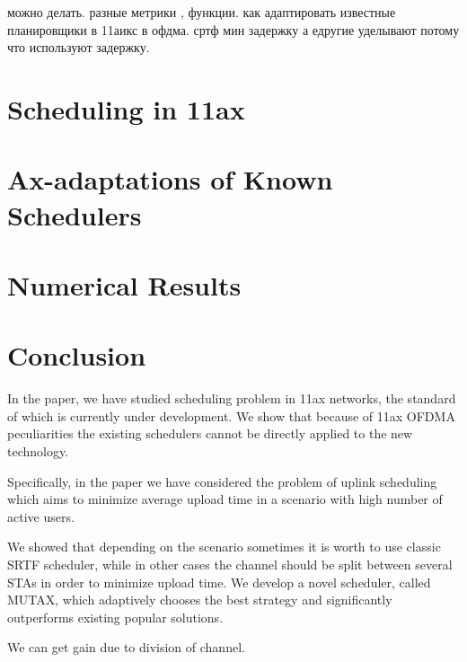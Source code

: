 можно делать. разные метрики , функции. как адаптировать известные планировщики в 11аикс в офдма. 
сртф мин задержку а едругие уделывают потому что используют задержку. 
\section{Scheduling in 11ax}

\section{Ax-adaptations of Known Schedulers}

\section{Numerical Results}

\section{Conclusion}

In the paper, we have studied scheduling problem in 11ax networks, the standard of which is currently under development.
We show that because of 11ax OFDMA peculiarities the existing schedulers cannot be directly applied to the new technology.

Specifically, in the paper we have considered the problem of uplink scheduling which aims to minimize average upload time in a scenario with high number of active users.

We showed that depending on the scenario sometimes it is worth to use classic SRTF scheduler, while in other cases the channel should be split between several STAs in order to minimize upload time.
We develop a novel scheduler, called MUTAX, which adaptively chooses the best strategy and significantly outperforms existing popular solutions.

We can get gain due to division of channel. 














\clearpage

